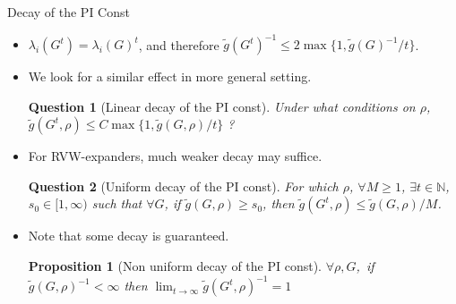 \documentclass[compress]{beamer}
\newtheorem{question}{Question}
\newtheorem{proposition}{Proposition}
\begin{document}
\begin{frame}{Decay of the PI Const}

\begin{itemize}[<+->]
\item  $\lambda_i(G^t)=\lambda_i(G)^t$, and therefore $\tilde g (G^t)^{-1} \le 2 \max\{1, \tilde g(G)^{-1}/t\}$.

\item We look for a similar effect in more general setting.

\begin{question}[Linear decay of the PI const]
Under what conditions on $\rho$,  $\tilde g(G^t,\rho) \le C\max\{1,\tilde g(G,\rho)/t\}$ ?
\end{question}

\item For RVW-expanders, much weaker decay may suffice.

\begin{question}[Uniform decay of the PI const] 
For which $\rho$, $\forall M\ge 1$,  $\exists t\in\mathbb N$,  $s_0\in[1,\infty)$ such that
$\forall G$, if $\tilde g(G,\rho)\ge s_0$, then $\tilde g (G^t,\rho) \le \tilde g(G,\rho)/M$.
\end{question}

\item Note that some decay is guaranteed.
\begin{proposition} [Non uniform decay of the PI const]
$\forall \rho, G$,\ if $\tilde g(G,\rho)^{-1}<\infty$ then $\lim _{t\to \infty}\tilde g(G^t,\rho)^{-1}=1$
\end{proposition}

\end{itemize}


%
%
%
\end{frame}
\end{document}
